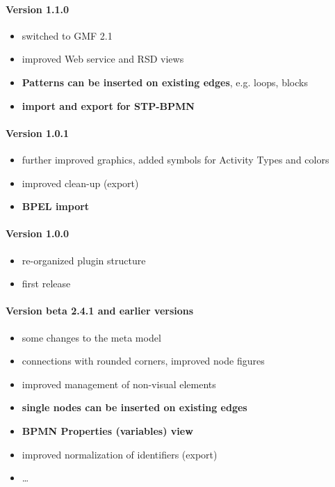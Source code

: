 \paragraph{Version 1.1.0}
\begin{itemize}
	\item switched to GMF 2.1
	\item improved Web service and RSD views
	\item \textbf{Patterns can be inserted on existing edges}, e.g. loops, blocks
	\item \textbf{import and export for STP-BPMN}
\end{itemize}

\paragraph{Version 1.0.1}
\begin{itemize}
	\item further improved graphics, added symbols for Activity Types and colors
	\item improved clean-up (export)
	\item \textbf{BPEL import}
\end{itemize}

\paragraph{Version 1.0.0}
\begin{itemize}
	\item re-organized plugin structure
	\item first release
\end{itemize}

\paragraph{Version beta 2.4.1 and earlier versions}
\begin{itemize}
	\item some changes to the meta model
	\item connections with rounded corners, improved node figures
	\item improved management of non-visual elements
	\item \textbf{single nodes can be inserted on existing edges}
	\item \textbf{BPMN Properties (variables) view}
	\item improved normalization of identifiers (export)
	\item \dots
\end{itemize}


